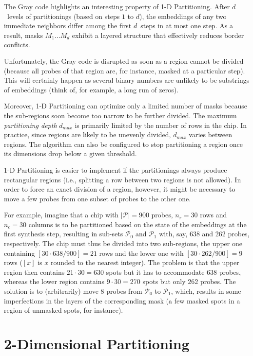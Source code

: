 The Gray code highlights an interesting property of 1-D Partitioning.
After $d$~levels of partitionings (based on steps $1$ to $d$), the
embeddings of any two immediate neighbors differ among the first
$d$~steps in at most one step.  As a result, masks $M_1 \dots M_d$
exhibit a layered structure that effectively reduces border conflicts.

Unfortunately, the Gray code is disrupted as soon as a region cannot be divided
(because all probes of that region are, for instance, masked at a particular
step). This will certainly happen as several binary numbers are unlikely to be
substrings of embeddings (think of, for example, a long run of zeros).

Moreover, 1-D Partitioning can optimize only a limited number of masks
because the sub-regions soon become too narrow to be further divided. The
maximum \emph{partitioning depth} $d_{max}$ is primarily limited by the number
of rows in the chip. In practice, since regions are likely to be unevenly
divided, $d_{max}$ varies between regions. The algorithm can also be configured
to stop partitioning a region once its dimensions drop below a given threshold.

1-D Partitioning is easier to implement if the partitionings always produce
rectangular regions (i.e., splitting a row between two regions is not allowed).
In order to force an exact division of a region, however, it might be necessary
to move a few probes from one subset of probes to the other one.

For example, imagine that a chip with $|\mathcal{P}| = 900$ probes, $n_r = 30$
rows and $n_c = 30$ columns is to be partitioned based on the state of the
embeddings at the first synthesis step, resulting in sub-sets $\mathcal{P}_0$
and $\mathcal{P}_1$ with, say, 638 and 262 probes, respectively. The chip must
thus be divided into two sub-regions, the upper one containing $[30 \cdot
638/900]=21$ rows and the lower one with $[30 \cdot 262/900]=9$ rows ($[x]$ is
$x$ rounded to the nearest integer). The problem is that the upper region then
contains $21 \cdot 30 = 630$ spots but it has to accommodate 638 probes,
whereas the lower region contains $9 \cdot 30 = 270$ spots but only 262
probes. The solution is to (arbitrarily) move 8 probes from $\mathcal{P}_0$ to
$\mathcal{P}_1$, which, results in some imperfections in the layers
of the corresponding mask (a few masked spots in a region of unmasked spots,
for instance).

\section{2-Dimensional Partitioning}
\label{sec:part_2d}

